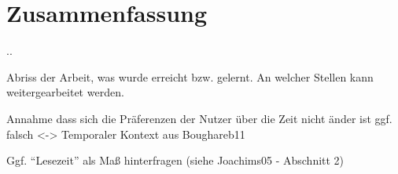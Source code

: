 
\section{Zusammenfassung}\newpage.\newpage\newpage.\newpage\newpage

	Abriss der Arbeit, was wurde erreicht bzw. gelernt. An welcher Stellen kann weitergearbeitet werden. 


Annahme dass sich die Präferenzen der Nutzer über die Zeit nicht änder ist ggf. falsch <-> Temporaler Kontext aus Boughareb11 

Ggf. ``Lesezeit'' als Maß hinterfragen (siehe Joachims05 - Abschnitt 2)
